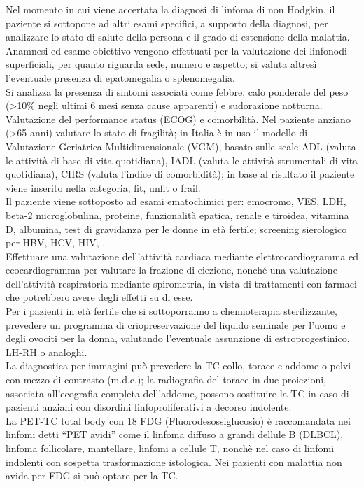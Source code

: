 Nel momento in cui viene accertata la diagnosi di linfoma di non Hodgkin, il paziente si sottopone ad altri 
esami specifici, a supporto della diagnosi, per analizzare lo stato di salute della persona e il grado di 
estensione della malattia.\\
Anamnesi ed esame obiettivo vengono effettuati per la valutazione dei linfonodi superficiali, per quanto 
riguarda sede, numero e aspetto; si valuta altresì l'eventuale presenza di epatomegalia o splenomegalia.\\
Si analizza la presenza di sintomi associati come febbre, calo ponderale del peso 
(>10\% negli ultimi 6 mesi senza cause apparenti) e sudorazione notturna\cite{reteveneta}.\\
Valutazione del performance status (ECOG) e comorbilità. 
Nel paziente anziano (>65 anni) valutare lo stato di fragilità; in Italia è in uso il modello di 
Valutazione Geriatrica Multidimensionale (VGM), basato sulle scale ADL (valuta le attività di base di vita quotidiana),
IADL (valuta le attività strumentali di vita quotidiana), CIRS (valuta l’indice di comorbidità); 
in base al risultato il paziente viene inserito nella categoria, fit, unfit o frail\cite{reteveneta}.\\
Il paziente viene sottoposto ad esami ematochimici per: emocromo, VES, LDH, beta-2 microglobulina, proteine, 
funzionalità epatica, renale e tiroidea, vitamina D, albumina, test di gravidanza per le donne in età fertile; 
screening sierologico per HBV, HCV, HIV\cite{AIOM}, \cite{reteveneta}.\\
Effettuare una valutazione dell’attività cardiaca mediante elettrocardiogramma ed ecocardiogramma per valutare 
la frazione di eiezione, nonché una valutazione dell’attività respiratoria mediante spirometria, in vista di 
trattamenti con farmaci che potrebbero avere degli effetti su di esse\cite{AIOM}.\\ 
Per i pazienti in età fertile che si sottoporranno a chemioterapia sterilizzante, prevedere un programma di 
criopreservazione del liquido seminale per l’uomo e degli ovociti per la donna, valutando l’eventuale assunzione di 
estroprogestinico, LH-RH o analoghi\cite{AIOM}.\\

La diagnostica per immagini può prevedere la TC collo, torace e addome o pelvi con mezzo di contrasto (m.d.c.); 
la radiografia del torace in due proiezioni, associata all’ecografia completa dell’addome, possono sostituire 
la TC in caso di pazienti anziani con disordini linfoproliferativi a decorso indolente.\\
La PET-TC total body con 18 FDG (Fluorodesossiglucosio) è raccomandata nei linfomi detti “PET avidi” come il linfoma diffuso 
a grandi dellule B (DLBCL), linfoma follicolare, mantellare, linfomi a cellule T, nonchè nel caso di linfomi indolenti 
con sospetta trasformazione istologica. Nei pazienti con malattia non avida per FDG si può optare per la TC\cite{reteveneta}.\\ 

